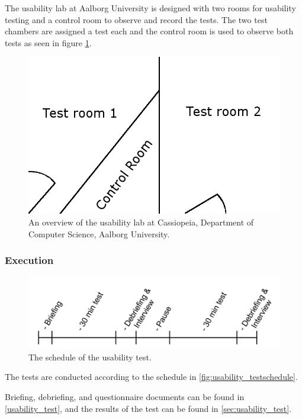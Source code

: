 The usability lab at Aalborg University is designed with two rooms for usability testing and a control room to observe and record the tests.
The two test chambers are assigned a test each and the control room is used to observe both tests as seen in figure \ref{fig:test_setup}.

\begin{figure}[!h]
	\centering
		\includegraphics[width=\textwidth]{gfx/test_setup.png}
	\caption{An overview of the usability lab at Cassiopeia, Department of Computer Science, Aalborg University.}
	\label{fig:test_setup}
\end{figure}

\subsubsection*{Execution}

\begin{figure}[!h]
	\centering
		\includegraphics[width=\textwidth]{gfx/usability_testschedule.png}
	\caption{The schedule of the usability test.}
	\label{fig:usability_testschedule}
\end{figure}

The tests are conducted according to the schedule in \autoref{fig:usability_testschedule}.

Briefing, debriefing, and questionnaire documents can be found in \autoref{usability_test}, and the results of the test can be found in \autoref{sec:usability_test}.